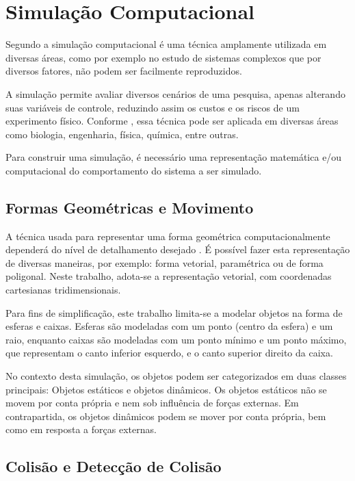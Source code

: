 \documentclass[12pt]{article}
\begin{document}
\section{Simulação Computacional}

Segundo \cite{duran2018computer} a simulação computacional é uma técnica amplamente utilizada em diversas áreas, como por exemplo no estudo de sistemas complexos que por diversos fatores, não podem ser facilmente reproduzidos.

A simulação permite avaliar diversos cenários de uma pesquisa, apenas alterando suas variáveis de controle, reduzindo assim os custos e os riscos de um experimento físico. Conforme \cite{marschner2018}, essa técnica pode ser aplicada em diversas áreas como biologia, engenharia, física, química, entre outras.

Para construir uma simulação, é necessário uma representação matemática e/ou computacional do comportamento do sistema a ser simulado.

\subsection{Formas Geométricas e Movimento}
A técnica usada para representar uma forma geométrica computacionalmente dependerá do nível de detalhamento desejado \cite{pharr2016}. É possível fazer esta representação de diversas maneiras, por exemplo: forma vetorial, paramétrica ou de forma poligonal. Neste trabalho, adota-se a representação vetorial, com coordenadas cartesianas tridimensionais.

Para fins de simplificação, este trabalho limita-se a modelar objetos na forma de esferas e caixas. Esferas são modeladas com um ponto (centro da esfera) e um raio, enquanto caixas são modeladas com um ponto mínimo e um ponto máximo, que representam o canto inferior esquerdo, e o canto superior direito da caixa.

No contexto desta simulação, os objetos podem ser categorizados em duas classes principais: Objetos estáticos e objetos dinâmicos. Os objetos estáticos não se movem por conta própria e nem sob influência de forças externas. Em contrapartida, os objetos dinâmicos podem se mover por conta própria, bem como em resposta a forças externas.

\subsection{Colisão e Detecção de Colisão}
\end{document}
